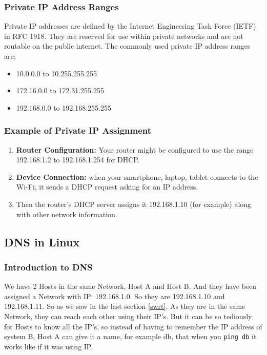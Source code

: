\documentclass{article}
\begin{document}
\subsubsection{Private IP Address Ranges}

Private IP addresses are defined by the Internet Engineering Task Force (IETF) in RFC 1918. They are reserved for use within private networks and are not routable on the public internet. The commonly used private IP address ranges are:

\begin{itemize}
    \item 10.0.0.0 to 10.255.255.255
    \item 172.16.0.0 to 172.31.255.255
    \item 192.168.0.0 to 192.168.255.255
\end{itemize}

\subsubsection{Example of Private IP Assignment}
\begin{enumerate}
    \item \textbf{Router Configuration:} Your router might be configured to use the range 192.168.1.2 to 192.168.1.254 for DHCP.
    \item \textbf{Device Connection:} when your smartphone, laptop, tablet connects to the Wi-Fi, it sends a DHCP request asking for an IP address.
    \item Then the router's DHCP server assigns it 192.168.1.10 (for example) along with other network information.
\end{enumerate}

\subsection{DNS in Linux}

\subsubsection{Introduction to DNS}

We have 2 Hosts in the same Network, Host A and Host B. And they have been assigned a Network with IP: 192.168.1.0. So they are 192.168.1.10 and 192.168.1.11. So as we saw in the last section \ref{swrt}. As they are in the same Network, they can reach each other using their IP's. But it can be so tediously for Hosts to know all the IP's, so instead of having to remember the IP address of system B, Host A can give it a name, for example db, that when you \verb|ping db| it works like if it was using IP.
\end{document}
